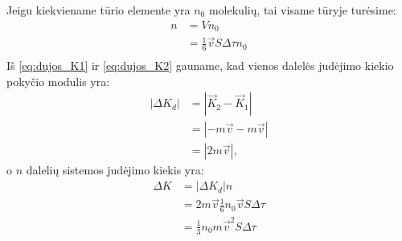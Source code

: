 Jeigu kiekviename tūrio elemente yra $n_{0}$ molekulių, tai visame tūryje
turėsime:
\begin{align}
  n
  &= Vn_{0} \\
  &= \frac{1}{6}\vec{v}S \Delta \tau n_{0} \\
  \label{eq:dujos_n}
\end{align}
Iš \ref{eq:dujos_K1} ir \ref{eq:dujos_K2} gauname, kad vienos dalelės
judėjimo kiekio pokyčio modulis yra:
\begin{align*}
  |\Delta K_{d}|
  &= |\vec{K}_{2} - \vec{K}_{1}| \\
  &= |-m\vec{v} - m\vec{v}| \\
  &= |2m\vec{v}|,
\end{align*}
o $n$ dalelių sistemos judėjimo kiekis yra:
\begin{align}
  \Delta K
  &= |\Delta K_{d}|n \\
  &= 2m\vec{v}\frac{1}{6}n_{0}\vec{v}S\Delta\tau \\
  &= \frac{1}{3}n_{0} m \vec{v}^{2}S\Delta\tau \\
  \label{eq:dujos_DK}
\end{align}

